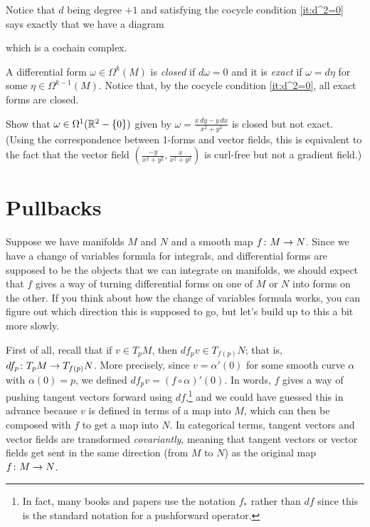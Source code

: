 Notice that $d$ being degree $+1$ and satisfying the cocycle condition \ref{it:d^2=0} says exactly that we have a diagram
	\begin{center}
	\end{center}
which is a cochain complex.
	
\begin{definition}\label{def:closed and exact}
	A differential form $\omega \in \Omega^k(M)$ is \emph{closed} if $d\omega = 0$ and it is \emph{exact} if $\omega = d\eta$ for some $\eta \in \Omega^{k-1}(M)$. Notice that, by the cocycle condition \ref{it:d^2=0}, all exact forms are closed.
\end{definition}

\begin{exercise}\label{ex:closed not exact}
	Show that $\omega \in \Omega^1(\mathbb{R}^2 - \{0\})$ given by $\omega = \frac{x\, dy - y \, dx}{x^2 + y^2}$ is closed but not exact. (Using the correspondence between 1-forms and vector fields, this is equivalent to the fact that the vector field $\left(\frac{-y}{x^2 + y^2}, \frac{x}{x^2+y^2}\right)$ is curl-free but not a gradient field.)
\end{exercise}

\section{Pullbacks}
\label{sec:pullbacks}

Suppose we have manifolds $M$ and $N$ and a smooth map $f \colon\thinspace\! M \to N$. Since we have a change of variables formula for integrals, and differential forms are supposed to be the objects that we can integrate on manifolds, we should expect that $f$ gives a way of turning differential forms on one of $M$ or $N$ into forms on the other. If you think about how the change of variables formula works, you can figure out which direction this is supposed to go, but let's build up to this a bit more slowly.

First of all, recall that if $v \in T_pM$, then $df_p v \in T_{f(p)}N$; that is, $df_p \colon\thinspace\! T_pM \to T_{f(p)}N$. More precisely, since $v = \alpha'(0)$ for some smooth curve $\alpha$ with $\alpha(0) = p$, we defined $df_pv = (f \circ \alpha)'(0)$. In words, $f$ gives a way of pushing tangent vectors forward using $df$,\footnote{In fact, many books and papers use the notation $f_\ast$ rather than $df$ since this is the standard notation for a pushforward operator.} and we could have guessed this in advance because $v$ is defined in terms of a map into $M$, which can then be composed with $f$ to get a map into $N$. In categorical terms, tangent vectors and vector fields are transformed \emph{covariantly}, meaning that tangent vectors or vector fields get sent in the same direction (from $M$ to $N$) as the original map $f\colon\thinspace\! M \to N$.

